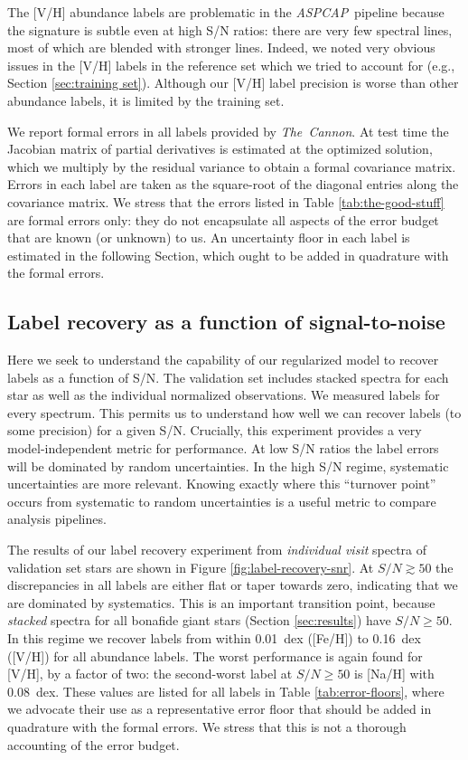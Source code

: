 \documentclass[12pt,preprint]{aastex}
\newcommand{\project}[1]{\textsl{#1}}
\newcommand{\TheCannon}{\project{The~Cannon}}
\newcommand{\acronym}[1]{{\small{#1}}}
\newcommand{\aspcap}{\project{\acronym{ASPCAP}}}
\begin{document}
The [V/H] abundance labels are problematic in the \aspcap\ pipeline 
because the signature is subtle even at high S/N ratios: there are very few
spectral lines, most of which are blended with stronger lines.  Indeed, we noted
very obvious issues in the [V/H] labels in the reference set which we tried to
account for (e.g., Section \ref{sec:training set}).  Although our [V/H]
label precision is worse than other abundance labels, it is limited by the
training set.


We report formal errors in all labels provided by \TheCannon. At test time the
Jacobian matrix of partial derivatives is estimated at the optimized solution,
which we multiply by the residual variance to obtain a formal covariance matrix.
Errors in each label are taken as the square-root of the diagonal entries along
the covariance matrix. We stress that the errors listed in Table \ref{tab:the-good-stuff}
are formal errors only: they do not encapsulate all aspects of the error budget
that are known (or unknown) to us. An uncertainty floor in each label is estimated
in the following Section, which ought to be added in quadrature with the formal
errors.

\subsection{Label recovery as a function of signal-to-noise}
\label{sec:label-recovery-snr}


Here we seek to understand the capability of our 
regularized model to recover labels as a function of S/N.  The validation set includes stacked spectra for each star
 as well as the individual normalized observations.  We measured labels for every spectrum.  This permits us
to understand how well we can recover labels (to some precision) for a given 
S/N.  Crucially, this experiment provides a very model-independent metric for
performance.  At low S/N ratios the label errors will be dominated by random
uncertainties.  In the high S/N regime, systematic uncertainties are more 
relevant.  Knowing exactly where this ``turnover point'' occurs from systematic
to random uncertainties is a useful metric to compare analysis pipelines.


The results of our label recovery experiment from \emph{individual visit} spectra of
validation set stars are shown in Figure \ref{fig:label-recovery-snr}.  
At $S/N \gtrsim 50$ the discrepancies in all
labels are either flat or taper towards zero, indicating that we are dominated
by systematics.  This is an important transition point, because \emph{stacked} spectra for all bonafide giant
stars (Section \ref{sec:results}) have $S/N \geq 50$.  In this regime we 
recover labels from within 0.01~dex ([Fe/H]) to 0.16~dex ([V/H]) for all 
abundance labels.  The worst performance is again found for [V/H], by a factor of
two: the second-worst label at $S/N \geq 50$ is [Na/H] with 0.08~dex.  These
values are listed for all labels in Table \ref{tab:error-floors}, where we advocate their use as a representative error floor that should be added in quadrature with the formal errors. We stress that this is not a thorough accounting of the error budget. 
\end{document}
